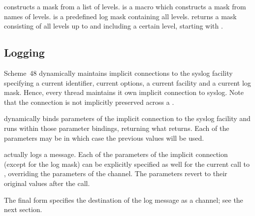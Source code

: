 \begin{protos}
\end{protos}
\noindent
{} constructs a mask from a list of levels.
 is a macro which constructs a mask from names of
levels.   is a predefined log mask containing
all levels.   returns a mask consisting of all
levels up to and including a certain level, starting with
.

\subsection*{Logging}

Scheme~48 dynamically maintains implicit connections to the syslog
facility specifying a current identifier, current options, a current
facility and a current log mask.  Hence, every thread
maintains it own implicit connection to syslog.  Note that the
connection is not implicitly preserved across a .

\begin{protos}
\end{protos}
\noindent
{} dynamically binds parameters of the
implicit connection to the syslog facility and runs 
within those parameter bindings, returning what 
returns.  Each of the parameters may be  in which case the
previous values will be used.

\begin{protos}
\end{protos}
\noindent
{} actually logs a message.  Each of the parameters of the
implicit connection (except for the log mask) can be explicitly
specified as well for the current call to , overriding
the parameters of the channel.  The parameters revert to their
original values after the call.

The final form specifies the destination of the log message as a
channel; see the next section.


